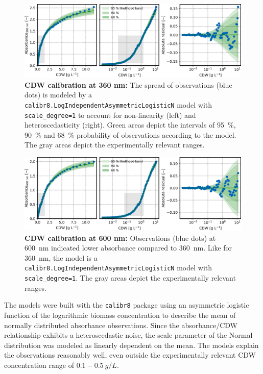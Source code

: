 \documentclass[sn-standardnature]{sn-jnl}%
\theoremstyle{thmstyleone}%
\theoremstyle{thmstyletwo}%
\theoremstyle{thmstylethree}%
\begin{document}
\begin{figure}[H]
    \centering
    \includegraphics[width=1.0\textwidth]{figures/cm_biomass_A360.png}
    \caption{
        \textbf{CDW calibration at 360 nm:}
        The spread of observations (blue dots) is modeled by a \texttt{calibr8.LogIndependentAsymmetricLogisticN} model with \texttt{scale\_degree=1} to account for non-linearity (left) and heteroscedasticity (right). 
        Green areas depict the intervals of 95~\%, 90~\% and 68~\% probability of observations according to the model.
        The gray areas depict the experimentally relevant ranges.
    }
    \label{fig_cmXA360}
\end{figure}

\begin{figure}[H]
    \centering
    \includegraphics[width=1.0\textwidth]{figures/cm_biomass_A600.png}
    \caption{
        \textbf{CDW calibration at 600 nm:}
        Observations (blue dots) at 600~nm indicated lower absorbance compared to 360~nm. Like for 360~nm, the model is a \texttt{calibr8.LogIndependentAsymmetricLogisticN} model with \texttt{scale\_degree=1}.
        The gray areas depict the experimentally relevant ranges.
    }
    \label{fig_cmXA600}
\end{figure}

The models were built with the \texttt{calibr8} package \cite{calibr8,calibr8Paper} using an asymmetric logistic function of the logarithmic biomass concentration to describe the mean of normally distributed absorbance observations.
Since the absorbance/CDW relationship exhibits a heteroscedastic noise, the scale parameter of the Normal distribution was modeled as linearly dependent on the mean.
The models explain the observations reasonably well, even outside the experimentally relevant CDW concentration range of $0.1-0.5~g/L$.
\end{document}
